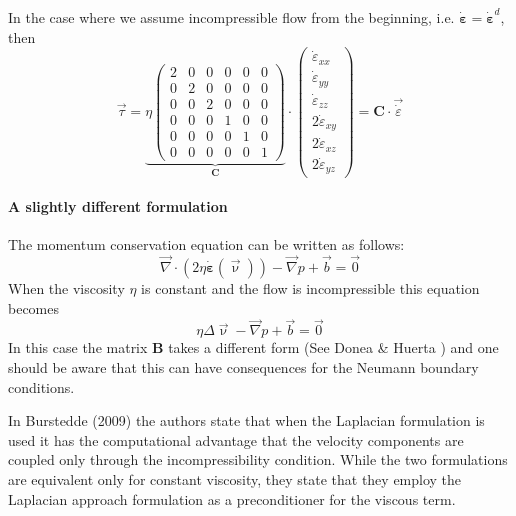 In the case where we assume incompressible flow from the beginning, 
i.e. $\dot{\bm \varepsilon}=\dot{\bm \varepsilon}^d$, 
then 
\begin{equation}
\vec \tau  
=
\underbrace{
\eta
\left(
\begin{array}{cccccc}
2 & 0& 0& 0& 0& 0\\
0 & 2& 0& 0& 0& 0\\
0 & 0& 2& 0& 0& 0\\
0 &0 &0 & 1& 0& 0\\
0 &0 &0 & 0& 1& 0\\
0 &0 &0 & 0& 0& 1 
\end{array}
\right)
}_{\bm C}
\cdot
\left(
\begin{array}{c}
\dot\varepsilon_{xx} \\
\dot\varepsilon_{yy} \\
\dot\varepsilon_{zz} \\
2\dot\varepsilon_{xy} \\
2\dot\varepsilon_{xz} \\
2\dot\varepsilon_{yz} 
\end{array}
\right)
=
{\bm C} \cdot \vec{\dot \varepsilon}
\end{equation}

\paragraph{A slightly different formulation}

The momentum conservation equation can be written as follows:
\[
\vec\nabla\cdot( 2 \eta \dot{\bm \varepsilon}(\vec\upnu)) - \vec\nabla p + \vec b = \vec 0
\]
When the viscosity $\eta$ is constant and the flow is incompressible this equation becomes
\[
\eta \Delta \vec \upnu - \vec\nabla p + \vec b = \vec 0
\]
In this case the matrix ${\bm B}$ takes a different form (See Donea \& Huerta \cite[Eq. 6.24]{dohu03})
and one should be aware that this can have consequences for the Neumann boundary conditions. 

In Burstedde \etal (2009) \cite{bugs09} the authors state that when the Laplacian formulation is used 
it has the computational advantage that the velocity
components are coupled only through the incompressibility condition. 
While the two formulations are equivalent only for constant viscosity, they state 
that they employ the Laplacian approach formulation as a preconditioner for the viscous term. 

